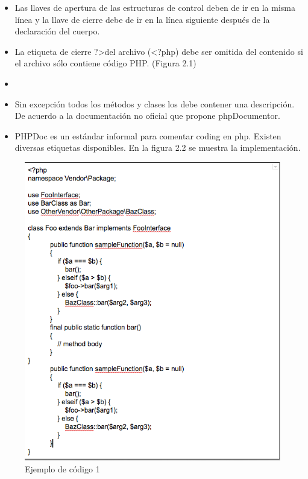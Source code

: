 \begin{itemize}
\begin{itemize}
\begin{itemize}
				\item Las llaves de apertura de las estructuras de control deben de ir en la misma línea y la llave de cierre debe de ir en la línea siguiente después de la declaración del cuerpo.

				\item La etiqueta de cierre ?\textgreater del archivo (\textless ?php) debe ser omitida del contenido si el archivo sólo contiene código PHP. (Figura 2.1)
				
				\item 								
				\item Sin excepción todos los métodos y clases los debe contener una descripción. De acuerdo a la documentación no oficial que propone phpDocumentor.

				
				\item PHPDoc es un estándar informal para comentar coding en php. Existen diversas etiquetas disponibles. En la figura 2.2 se muestra la implementación.

			\end{itemize}
	\end{itemize}
\end{itemize}

				\begin{figure}[htbp!]
		\centering
			\includegraphics[width=1\textwidth]{images/ejemploCodigo1}
		\caption{Ejemplo de código 1}
	\end{figure}
				

